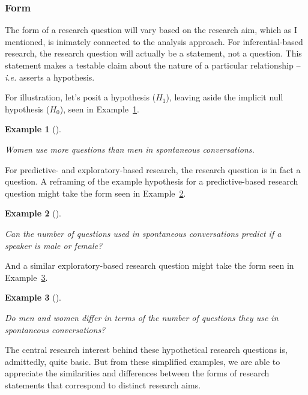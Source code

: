 \documentclass[
  letterpaper,
]{book}
\theoremstyle{definition}
\newtheorem{example}{Example}[chapter]
\theoremstyle{remark}
\begin{document}
\subsubsection{Form}\label{sec-research-question-form}

The form of a research question will vary based on the research aim,
which as I mentioned, is inimately connected to the analysis approach.
For inferential-based research, the research question will actually be a
statement, not a question. This statement makes a testable claim about
the nature of a particular relationship --\emph{i.e.} asserts a
hypothesis.

For illustration, let's posit a hypothesis (\(H_1\)), leaving aside the
implicit null hypothesis (\(H_0\)), seen in
Example~\ref{exm-research-form-infer}.

\begin{example}[]\protect\hypertarget{exm-research-form-infer}{}\label{exm-research-form-infer}

\emph{Women use more questions than men in spontaneous conversations.}

\end{example}

For predictive- and exploratory-based research, the research question is
in fact a question. A reframing of the example hypothesis for a
predictive-based research question might take the form seen in
Example~\ref{exm-research-form-pred}.

\begin{example}[]\protect\hypertarget{exm-research-form-pred}{}\label{exm-research-form-pred}

\emph{Can the number of questions used in spontaneous conversations
predict if a speaker is male or female?}

\end{example}

And a similar exploratory-based research question might take the form
seen in Example~\ref{exm-research-form-exp}.

\begin{example}[]\protect\hypertarget{exm-research-form-exp}{}\label{exm-research-form-exp}

\emph{Do men and women differ in terms of the number of questions they
use in spontaneous conversations?}

\end{example}

The central research interest behind these hypothetical research
questions is, admittedly, quite basic. But from these simplified
examples, we are able to appreciate the similarities and differences
between the forms of research statements that correspond to distinct
research aims.
\end{document}
